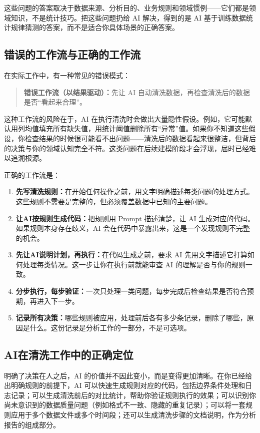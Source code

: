 这些问题的答案取决于数据来源、分析目的、业务规则和领域惯例——它们都是领域知识，不是统计技巧。把这些问题扔给 AI 解决，得到的是 AI 基于训练数据统计规律猜测的答案，而不是适合你具体场景的正确答案。

\subsection{错误的工作流与正确的工作流}

在实际工作中，有一种常见的错误模式：

\begin{quote}
\textbf{错误工作流（以结果驱动）：}先让 AI 自动清洗数据，再检查清洗后的数据是否“看起来合理”。
\end{quote}

这种工作流的风险在于，AI 在执行清洗时会做出大量隐性假设。例如，它可能默认用列均值填充所有缺失值，用统计阈值删除所有“异常”值。如果你不知道这些假设，你检查结果的时候很可能看不出问题——清洗后的数据看起来很整洁，但背后的决策与你的领域认知完全不符。这类问题在后续建模阶段才会浮现，届时已经难以追溯根源。

正确的工作流是：

\begin{enumerate}
  \item \textbf{先写清洗规则：}在开始任何操作之前，用文字明确描述每类问题的处理方式。这些规则不需要是完整的，但必须覆盖数据中已知的主要问题。
  \item \textbf{让AI按规则生成代码：}把规则用 Prompt 描述清楚，让 AI 生成对应的代码。如果规则本身存在歧义，AI 会在代码中暴露出来，这是一个发现规则不完整的机会。
  \item \textbf{先让AI说明计划，再执行：}在代码生成之前，要求 AI 先用文字描述它打算如何处理每类情况。这一步让你在执行前就能审查 AI 的理解是否与你的规则一致。
  \item \textbf{分步执行，每步验证：}一次只处理一类问题，每步完成后检查结果是否符合预期，再进入下一步。
  \item \textbf{记录所有决策：}哪些规则被应用，处理前后各有多少条记录，删除了哪些，原因是什么。这份记录是分析工作的一部分，不是可选项。
\end{enumerate}

\subsection{AI在清洗工作中的正确定位}

明确了决策在人之后，AI 的价值并不因此变小，而是变得更加清晰。在你已经给出明确规则的前提下，AI 可以快速生成规则对应的代码，包括边界条件处理和日志记录；可以生成清洗前后的对比统计，帮助你验证规则执行的效果；可以识别你尚未意识到的数据质量问题（例如格式不一致、隐藏的重复记录）；可以将一套规则应用于多个数据文件或多个时间段；还可以生成清洗步骤的文档说明，作为分析报告的组成部分。


